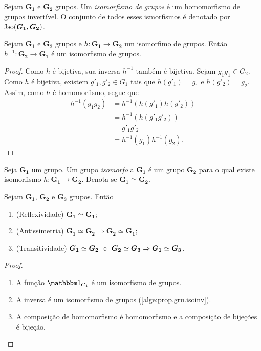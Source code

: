 \begin{defi}
Sejam $\bm{G_1}$ e $\bm{G_2}$ grupos. Um \emph{isomorfismo de grupos} é um homomorfismo de grupos invertível. O conjunto de todos esses ismorfismos é denotado por $\mathcal{I}\mathrm{so}(\bm{G_1},\bm{G_2})$. 
\end{defi}

\begin{prop}
\label{alge:prop.gru.isoinv}
Sejam $\bm{G_1}$ e $\bm{G_2}$ grupos e $h: \bm{G_1} \to \bm{G_2}$ um isomorfimo de grupos. Então $h^{-1}: \bm{G_2} \to \bm{G_1}$ é um isomorfismo de grupos.
\end{prop}
\begin{proof}
Como $h$ é bijetiva, sua inversa $h^{-1}$ também é bijetiva. Sejam $g_1g_1 \in G_2$. Como $h$ é bijetiva, existem $g'_1,g'_2 \in G_1$ tais que $h(g'_1)=g_1$ e $h(g'_2)=g_2$. Assim, como $h$ é homomorfismo, segue que
	\begin{align*}
	h^{-1}(g_1g_2) &= h^{-1}(h(g'_1)h(g'_2)) \\
								&= h^{-1}(h(g'_1g'_2)) \\
								&= g'_1g'_2 \\
								&= h^{-1}(g_1)h ^{-1}(g_2).
	\end{align*}
\end{proof}

\begin{defi}
Seja $\bm{G_1}$ um grupo. Um grupo \emph{isomorfo} a $\bm{G_1}$ é um grupo $\bm{G_2}$ para o qual existe isomorfismo $h: \bm{G_1} \to \bm{G_2}$. Denota-se $\bm{G_1} \simeq \bm{G_2}$.
\end{defi}

\begin{prop}
Sejam $\bm{G_1}$, $\bm{G_2}$ e $\bm{G_3}$ grupos. Então
	\begin{enumerate}
	\item (Reflexividade) $\bm{G_1} \simeq \bm{G_1}$;
	\item (Antissimetria) $\bm{G_1} \simeq \bm{G_2} \Rightarrow \bm{G_2} \simeq \bm{G_1}$;
	\item (Transitividade) $\bm{G_1} \simeq \bm{G_2} \text{\ \ e\ \ } \bm{G_2} \simeq \bm{G_3} \Rightarrow \bm{G_1} \simeq \bm{G_3}$.
	\end{enumerate}
\end{prop}
\begin{proof}
	\begin{enumerate}
	\item A função $\id_{G_1}$ é um isomorfismo de grupos.
	\item A inversa é um isomorfismo de grupos (\ref{alge:prop.gru.isoinv}).
	\item A composição de homomorfismo é homomorfismo e a composição de bijeções é bijeção.
	\end{enumerate}
\end{proof}

